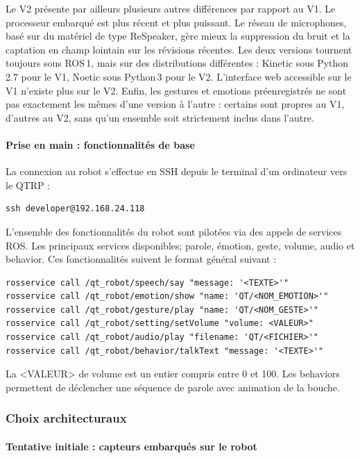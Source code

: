 \documentclass[11pt]{article}
\begin{document}
Le V2 présente par ailleurs plusieurs autres différences par rapport au V1. Le processeur embarqué est plus récent et plus puissant. Le réseau de microphones, basé sur du matériel de type ReSpeaker, gère mieux la suppression du bruit et la captation en champ lointain sur les révisions récentes. Les deux versions tournent toujours sous ROS\,1, mais sur des distributions différentes : Kinetic sous Python\,2.7 pour le V1, Noetic sous Python\,3 pour le V2. L'interface web accessible sur le V1 n'existe plus sur le V2. Enfin, les gestures et emotions préenregistrés ne sont pas exactement les mêmes d'une version à l'autre : certains sont propres au V1, d'autres au V2, sans qu'un ensemble soit strictement inclus dans l'autre.

\paragraph{Prise en main : fonctionnalités de base}

La connexion au robot s'effectue en SSH depuis le terminal d'un ordinateur vers le QTRP :

\begin{verbatim}
ssh developer@192.168.24.118
\end{verbatim}

L'ensemble des fonctionnalités du robot sont pilotées via des appels de services ROS. Les principaux services disponibles; parole, émotion, geste, volume, audio et behavior. Ces fonctionnalités suivent le format général suivant :

\begin{verbatim}
rosservice call /qt_robot/speech/say "message: '<TEXTE>'"
rosservice call /qt_robot/emotion/show "name: 'QT/<NOM_EMOTION>'"
rosservice call /qt_robot/gesture/play "name: 'QT/<NOM_GESTE>'"
rosservice call /qt_robot/setting/setVolume "volume: <VALEUR>"
rosservice call /qt_robot/audio/play "filename: 'QT/<FICHIER>'"
rosservice call /qt_robot/behavior/talkText "message: '<TEXTE>'"
\end{verbatim}

La <VALEUR> de volume est un entier compris entre 0 et 100. Les behaviors permettent de déclencher une séquence de parole avec animation de la bouche.

\subsubsection{Choix architecturaux}
\label{sec:architecture}

\paragraph{Tentative initiale : capteurs embarqués sur le robot}
\end{document}
